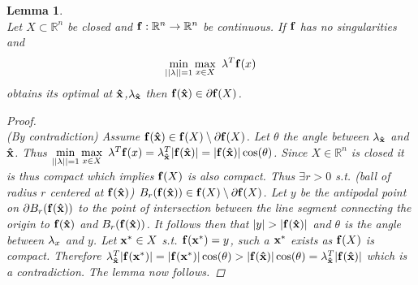 \documentclass[11pt]{article}
\theoremstyle{plain}
\newtheorem{lem}[thm]{Lemma}
\theoremstyle{definition}
\theoremstyle{remark}
\begin{document}
\begin{lem} \ \\
\label{lem:BdOpt}
Let $X\subset\mathbb{R}^n$ be closed and $\bold{f}:\mathbb{R}^n\rightarrow\mathbb{R}^n$ be continuous. If $\bold{f}$ has no singularities and $$\min\limits_{||\bold{\lambda}||=1}\max\limits_{x\in X}\ \bold{\lambda}^T\bold{f}(x)$$
obtains its optimal at $\bold{\hat{x}}$,$\bold{\lambda}_{\bold{\hat{x}}}$ then $\bold{f}(\bold{\hat{x}})\in \partial \bold{f}(X)$. 

\begin{proof} \ \\
(By contradiction) Assume $\bold{f}(\bold{\hat{x}})\in \bold{f}(X)\setminus\partial \bold{f}(X)$. Let $\theta$ the angle between $\bold{\lambda}_{\bold{\hat{x}}}$ and $\bold{\hat{x}}$. Thus $\min\limits_{||\bold{\lambda}||=1}\max\limits_{x\in X}\ \bold{\lambda}^T\bold{f}(x)=\bold{\lambda}_{\bold{\hat{x}}}^T|\bold{f}(\bold{\hat{x}})|=|\bold{f}(\bold{\hat{x}})|\cos(\theta)$. Since $X\in\mathbb{R}^n$ is closed it is thus compact which implies $\bold{f}(X)$ is also compact. Thus $\exists r>0$ s.t. (ball of radius $r$ centered at $\bold{f}(\bold{\hat{x}})$) $B_r(\bold{f}(\bold{\hat{x}}))\in \bold{f}(X)\setminus\partial \bold{f}(X)$. Let $y$ be the antipodal point on $\partial B_r(\bold{f}(\bold{\hat{x}}))$ to the point of intersection between the line segment connecting the origin to $\bold{f}(\bold{\hat{x}})$ and $B_r(\bold{f}(\bold{\hat{x}}))$. It follows then that $|y|>|\bold{f}(\bold{\hat{x}})|$ and $\theta$ is the angle between $\bold{\lambda}_x$ and $y$.   Let $\bold{x^*}\in X$ s.t. $\bold{f}(\bold{x^*})=y$, such a $\bold{x^*}$ exists as $\bold{f}(X)$ is compact. Therefore $\bold{\lambda}_{\bold{\hat{x}}}^T|\bold{f}(\bold{x^*})|=|\bold{f}(\bold{x^*})|\cos(\theta)>|\bold{f}(\bold{\hat{x}})|\cos(\theta)=\bold{\lambda}_{\bold{\hat{x}}}^T|\bold{f}(\bold{\hat{x}})|$ which is a contradiction. 
The lemma now follows.
\end{proof}
\end{lem}
\end{document}
